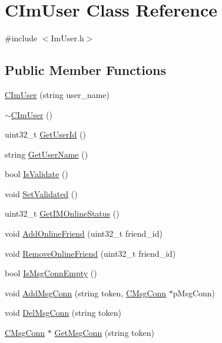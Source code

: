 \hypertarget{class_c_im_user}{}\section{C\+Im\+User Class Reference}
\label{class_c_im_user}


{\ttfamily \#include $<$Im\+User.\+h$>$}

\subsection*{Public Member Functions}
\begin{DoxyCompactItemize}
\item 
\hyperlink{class_c_im_user_a8da914a9745c59cfbe0fdee4efa3915a}{C\+Im\+User} (string user\+\_\+name)
\item 
\hyperlink{class_c_im_user_ad159468d51219a09a2e40b552a74c5e9}{$\sim$\+C\+Im\+User} ()
\item 
uint32\+\_\+t \hyperlink{class_c_im_user_ab9e9c5dbb85c2e6b897f58f59208dad1}{Get\+User\+Id} ()
\item 
string \hyperlink{class_c_im_user_abae435fb4fe1af4c57c756db7d6e0625}{Get\+User\+Name} ()
\item 
bool \hyperlink{class_c_im_user_a49cd7426df3646b9343a22cacdf5ea95}{Is\+Validate} ()
\item 
void \hyperlink{class_c_im_user_af0128d01e9ced7f7c0c44e37c3e6548f}{Set\+Validated} ()
\item 
uint32\+\_\+t \hyperlink{class_c_im_user_ab8a7d7fd0dff869ccc0bf8a28579639f}{Get\+I\+M\+Online\+Status} ()
\item 
void \hyperlink{class_c_im_user_a560466ce7802f1f9ca659a22998863a4}{Add\+Online\+Friend} (uint32\+\_\+t friend\+\_\+id)
\item 
void \hyperlink{class_c_im_user_a3c88bc3e6d7a91edc6bcbae10fa00ae5}{Remove\+Online\+Friend} (uint32\+\_\+t friend\+\_\+id)
\item 
bool \hyperlink{class_c_im_user_a03af14b6713d7e2e222b5d2041f916e5}{Is\+Msg\+Conn\+Empty} ()
\item 
void \hyperlink{class_c_im_user_a1d4ecf8f06cc570812aede8c2d199496}{Add\+Msg\+Conn} (string token, \hyperlink{class_c_msg_conn}{C\+Msg\+Conn} $\ast$p\+Msg\+Conn)
\item 
void \hyperlink{class_c_im_user_a89ecaf9a62237bd1de0b195fe213b925}{Del\+Msg\+Conn} (string token)
\item 
\hyperlink{class_c_msg_conn}{C\+Msg\+Conn} $\ast$ \hyperlink{class_c_im_user_a967dfd98c6cd3957af57ea74d1786b1c}{Get\+Msg\+Conn} (string token)

\end{DoxyCompactItemize}
